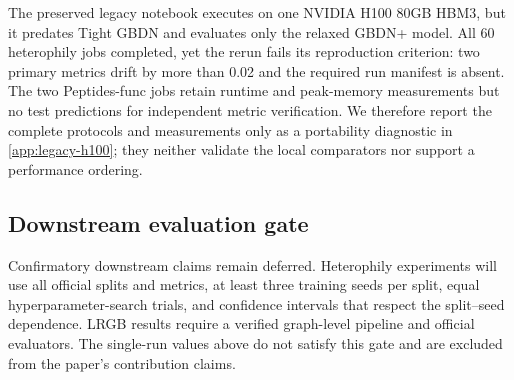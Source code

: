 The preserved legacy notebook executes on one NVIDIA H100 80GB HBM3, but it
predates Tight GBDN and evaluates only the relaxed GBDN+ model.  All 60
heterophily jobs completed, yet the rerun fails its reproduction criterion:
two primary metrics drift by more than 0.02 and the required run manifest is
absent.  The two Peptides-func jobs retain runtime and peak-memory measurements
but no test predictions for independent metric verification.  We therefore
report the complete protocols and measurements only as a portability
diagnostic in \cref{app:legacy-h100}; they neither validate the local
comparators nor support a performance ordering.

\subsection{Downstream evaluation gate}

Confirmatory downstream claims remain deferred. Heterophily experiments will use all official splits and metrics, at least three training seeds per split, equal hyperparameter-search trials, and confidence intervals that respect the split--seed dependence. LRGB results require a verified graph-level pipeline and official evaluators. The single-run values above do not satisfy this gate and are excluded from the paper's contribution claims.
